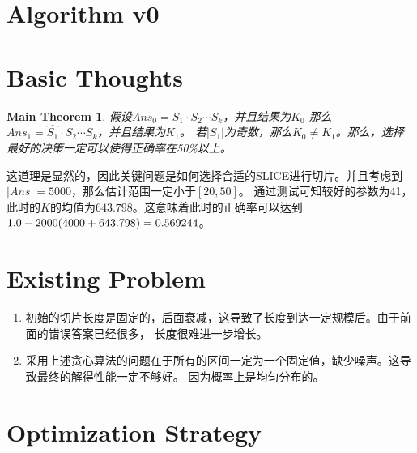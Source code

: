 \documentclass[hyperref,UTF8]{ctexart}
\newtheorem{mthm}[thm]{Main Theorem}
\theoremstyle{definition}
\theoremstyle{remark}
\numberwithin{equation}{subsection}
\begin{document}
	
\section{Algorithm v0}
\label{sec:algo_v0}

\section{Basic Thoughts}

	\begin{mthm}
	假设$Ans_0 = S_1 \cdot S_2 \cdots S_k$，并且结果为$K_0$
	那么$Ans_1 = \hat{S_1} \cdot S_2 \cdots S_k$，并且结果为$K_1$。
	若$|S_1|$为奇数，那么$K_0 \neq K_1$。那么，选择最好的决策一定可以使得正确率在50\%以上。
	\end{mthm}
	
	这道理是显然的，因此关键问题是如何选择合适的SLICE进行切片。并且考虑到$|Ans| = 5000$，那么估计范围一定小于$[20, 50]$。
	通过测试可知较好的参数为41，此时的$K$的均值为$643.798$。这意味着此时的正确率可以达到
	$1.0 - 2000 \/ (4000 +  643.798) = 0.569244$。

\section{Existing Problem}
	
	\begin{enumerate}[(1)]
	
		\item 初始的切片长度是固定的，后面衰减，这导致了长度到达一定规模后。由于前面的错误答案已经很多，
		长度很难进一步增长。
		
		\item 采用上述贪心算法的问题在于所有的区间一定为一个固定值，缺少噪声。这导致最终的解得性能一定不够好。
		因为概率上是均匀分布的。
		
	\end{enumerate}
	
\section{Optimization Strategy}
\end{document}
